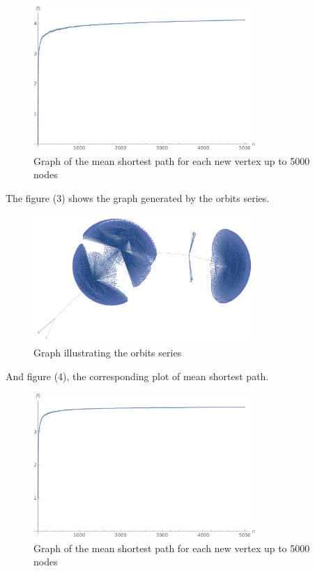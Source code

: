 \documentclass[a4paper,12pt]{article}
\begin{document}
\begin{figure}[h!]
    \centering
    \includegraphics[width=0.75\textwidth]{growth-divisors.pdf}
    \caption{Graph of the mean shortest path for each new vertex up to 5000 nodes}
    \label{graphs}
\end{figure}


The figure (3) shows the graph generated by the orbits series.

\begin{figure}[h!]
    \includegraphics[width=0.75\textwidth]{orbits}
    \centering
    \caption{Graph illustrating the orbits series}
    \label{frame}
\end{figure}


And figure (4), the corresponding plot of mean shortest path.

\begin{figure}[h!]
    \centering
    \includegraphics[width=0.75\textwidth]{growth-orbits.pdf}
    \caption{Graph of the mean shortest path for each new vertex up to 5000 nodes}
    \label{graphs}
\end{figure}
\end{document}
